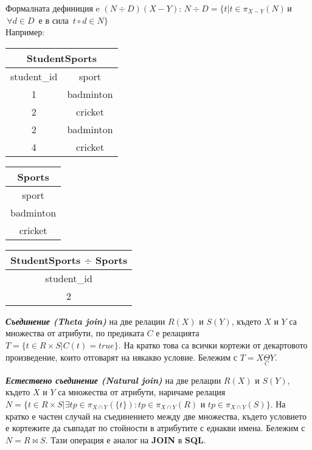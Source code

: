 \documentclass[fleqn,12pt]{article}
\begin{document}
Формалната дефиниция e $(N \div D)(X-Y): \, N \div D = \{t | t \in \pi_{X-Y} (N) \, $и$ \, \forall d \in D \,$ е в сила $\, t \circ d \in N \}$\\
Например:\\

\begin{multicols}{3}
\begin{center}
\begin{tabular}{ |c|c| }
    \hline
    \multicolumn{2}{|c|}{StudentSports} \\
    \hline
    student\_id & sport \\
    \hline
    1 & badminton \\
    2 & cricket \\
    2 & badminton \\
    4 & cricket \\
    \hline
\end{tabular}
\end{center}

\begin{center}
\begin{tabular}{ |c| } 
    \hline
    \multicolumn{1}{|c|}{Sports} \\
    \hline
    sport \\
    \hline
    badminton \\
    cricket \\
    \hline
\end{tabular}
\end{center}

\begin{center}
\begin{tabular}{ |c| } 
    \hline
    \multicolumn{1}{|c|}{StudentSports $\div$ Sports} \\
    \hline
    student\_id \\
    \hline
    2 \\
    \hline
\end{tabular}
\end{center}

\end{multicols}

\textbf{\textit{Съединение (Theta join)}} на две релации $R(X)$ и $S(Y)$, където $X$ и $Y$ са множества от атрибути, по предиката $C$ е релацията $T = \{t \in R \times S | C(t) = true\}$.
На кратко това са всички кортежи от декартовото произведение, които отговарят на някакво условие.
\bigbreak
Бележим с $T = X \underset{C}{\Theta} Y$.

\textbf{\textit{Естествено съединение (Natural join)}} на две релации $R(X)$ и $S(Y)$, където $X$ и $Y$ са множества от атрибути, наричаме релация $N = \{t \in R \times S | \exists tp \in \pi_{X \cap Y}(\{t\}): tp \in \pi_{X \cap Y}(R)$ и $tp \in \pi_{X \cap Y}(S)\}$.
На кратко е частен случай на съединението между две множества, където условието е кортежите да съвпадат по стойности в атрибутите с еднакви имена.
\bigbreak
Бележим с $N = R \bowtie S$. Тази операция е аналог на \textbf{JOIN} в \textbf{SQL}.
\end{document}
